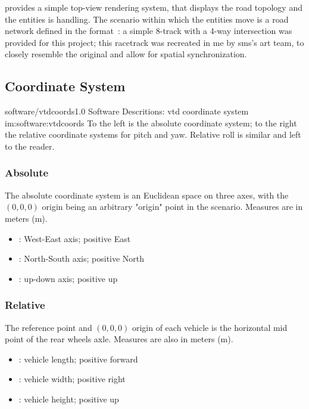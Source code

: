  provides a simple top-view rendering system, that displays the road topology and the entities  is handling. The scenario within which the entities move is a road network defined in the  format~\cite{software:opendrive}: a simple 8-track with a 4-way intersection was provided for this project; this racetrack was recreated in \gls{me} by \gls{sms}'s art team, to closely resemble the original and allow for spatial synchronization.

\subsection{Coordinate System}

\begin{image}
	{software/vtdcoords}{1.0}
	{Software Descritions: \gls{vtd} coordinate system}
	{im:software:vtdcoords}
	{}
	{To the left is the absolute coordinate system; to the right the relative coordinate systems for pitch and yaw. Relative roll is similar and left to the reader.}
\end{image}

\subsubsection{Absolute}

The absolute coordinate system is an Euclidean space on three axes, with the $(0,0,0)$ origin being an arbitrary "origin" point in the scenario. Measures are in meters (\si{\meter}).

\begin{itemize}
	\item {}: West-East axis; positive East
	\item {}: North-South axis; positive North
	\item {}: up-down axis; positive up
\end{itemize}

\subsubsection{Relative}

The reference point and $(0,0,0)$ origin of each vehicle is the horizontal mid point of the rear wheels axle. Measures are also in meters (\si{\meter}).

\begin{itemize}
	\item {}: vehicle length; positive forward
	\item {}: vehicle width; positive right
	\item {}: vehicle height; positive up
\end{itemize}

